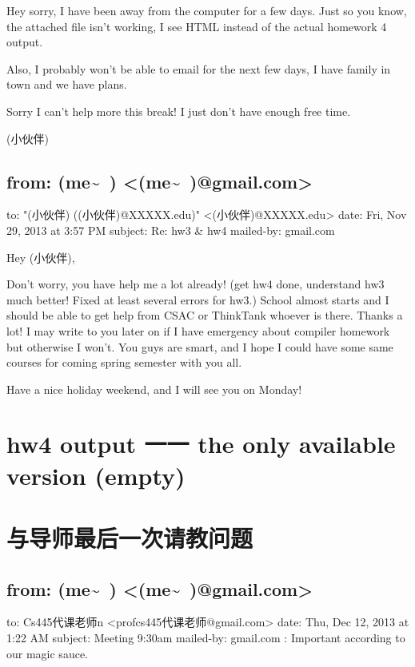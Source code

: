 \documentclass[12pt]{book}
\begin{document}
Hey sorry, I have been away from the computer for a few days. Just so you know, the attached file isn't working, I see HTML instead of the actual homework 4 output.

Also, I probably won't be able to email for the next few days, I have family in town and we have plans. 

Sorry I can't help more this break! I just don't have enough free time.

(小伙伴)


\section{from:         (me\textasciitilde{}~) <(me\textasciitilde{}~)@gmail.com>}
\label{sec-1-7}
to:         "(小伙伴) ((小伙伴)@XXXXX.edu)" <(小伙伴)@XXXXX.edu>
date:         Fri, Nov 29, 2013 at 3:57 PM
subject:         Re: hw3 \& hw4
mailed-by:         gmail.com

Hey (小伙伴), 

Don't worry, you have help me a lot already! (get hw4 done, understand hw3 much better! Fixed at least several errors for hw3.) School almost starts and I should be able to get help from CSAC or ThinkTank whoever is there. Thanks a lot! I may write to you later on if I have emergency about compiler homework but otherwise I won't. You guys are smart, and I hope I could have some same courses for coming spring semester with you all.  

Have a nice holiday weekend, and I will see you on Monday!

\chapter{hw4 output 一一 the only available version (empty)}
\label{sec-2}

\chapter{与导师最后一次请教问题}
\label{sec-3}

\section{from:         (me\textasciitilde{}~) <(me\textasciitilde{}~)@gmail.com>}
\label{sec-3-1}
to:         Cs445代课老师n <profcs445代课老师@gmail.com>
date:         Thu, Dec 12, 2013 at 1:22 AM
subject:         Meeting 9:30am
mailed-by:         gmail.com
:         Important according to our magic sauce.
\end{document}

